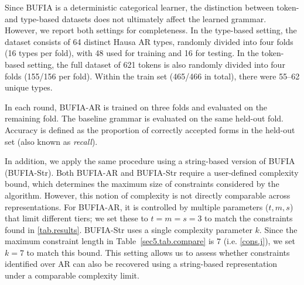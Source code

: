 Since BUFIA is a deterministic categorical learner, the distinction 
between token- and type-based datasets does not ultimately affect the 
learned grammar. However, we report both settings for completeness. 
In the type-based setting, the dataset consists of 
64 distinct Hausa AR types, randomly divided into four folds (16 types
per fold), with 48 used for training and 16 for testing. In the token-based setting, the full dataset of 621 
tokens is also randomly divided into four folds (155/156 per fold). Within 
the train set (465/466 in total), there were 55–62 unique types.

In each round, BUFIA-AR is trained on three folds and evaluated on the 
remaining fold. The baseline grammar is evaluated on the same held-out 
fold. Accuracy is defined as the proportion of correctly accepted forms in the held-out set (also known as \textit{recall}).

In addition, we apply the same procedure using a string-based 
version of BUFIA (BUFIA-Str). Both BUFIA-AR and BUFIA-Str require a user-defined complexity 
bound, which determines the maximum size of constraints considered 
by the algorithm. However, this notion of complexity is not directly 
comparable across representations. For BUFIA-AR, it is controlled 
by multiple parameters ($t, m, s$) that limit different tiers; 
we set these to $t = m = s = 3$ to match the constraints found in 
\ref{tab.results}. BUFIA-Str uses a single complexity 
parameter $k$. Since the maximum constraint length in 
Table~\ref{sec5.tab.compare} is $7$ (i.e. \ref{cons.j}), we set $k = 7$
to match this bound. This setting allows us to assess whether 
constraints identified over AR can also be recovered using a 
string-based representation under a comparable complexity limit.

